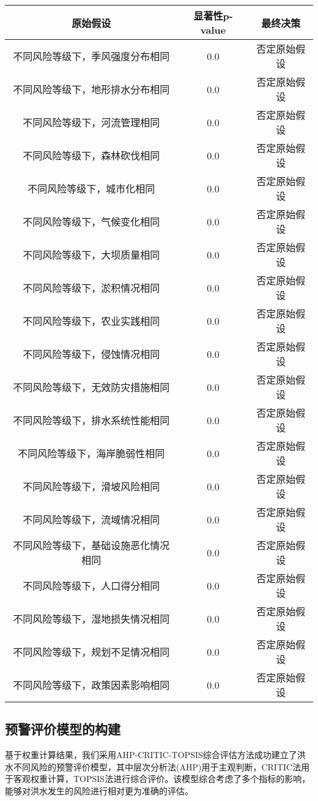 \documentclass[withoutpreface,bwprint]{cumcmthesis} %
\begin{document}
		\begin{longtable}{ccc}
			\toprule
			原始假设 & 显著性p-value & 最终决策 \\
			\midrule
			不同风险等级下，季风强度分布相同 & 0.0 & 否定原始假设 \\
			不同风险等级下，地形排水分布相同 & 0.0 & 否定原始假设 \\
			不同风险等级下，河流管理相同 & 0.0 & 否定原始假设 \\
			不同风险等级下，森林砍伐相同 & 0.0 & 否定原始假设 \\
			不同风险等级下，城市化相同 & 0.0 & 否定原始假设 \\
			不同风险等级下，气候变化相同 & 0.0 & 否定原始假设 \\
			不同风险等级下，大坝质量相同 & 0.0 & 否定原始假设 \\
			不同风险等级下，淤积情况相同 & 0.0 & 否定原始假设 \\
			不同风险等级下，农业实践相同 & 0.0 & 否定原始假设 \\
			不同风险等级下，侵蚀情况相同 & 0.0 & 否定原始假设 \\
			不同风险等级下，无效防灾措施相同 & 0.0 & 否定原始假设 \\
			不同风险等级下，排水系统性能相同 & 0.0 & 否定原始假设 \\
			不同风险等级下，海岸脆弱性相同 & 0.0 & 否定原始假设 \\
			不同风险等级下，滑坡风险相同 & 0.0 & 否定原始假设 \\
			不同风险等级下，流域情况相同 & 0.0 & 否定原始假设 \\
			不同风险等级下，基础设施恶化情况相同 & 0.0 & 否定原始假设 \\
			不同风险等级下，人口得分相同 & 0.0 & 否定原始假设 \\
			不同风险等级下，湿地损失情况相同 & 0.0 & 否定原始假设 \\
			不同风险等级下，规划不足情况相同 & 0.0 & 否定原始假设 \\
			不同风险等级下，政策因素影响相同 & 0.0 & 否定原始假设 \\
			\bottomrule
		\end{longtable}
		


\subsection{预警评价模型的构建}
基于权重计算结果，我们采用AHP-CRITIC-TOPSIS综合评估方法成功建立了洪水不同风险的预警评价模型，其中层次分析法(AHP)用于主观判断，CRITIC法用于客观权重计算，TOPSIS法进行综合评价。该模型综合考虑了多个指标的影响，能够对洪水发生的风险进行相对更为准确的评估。
\end{document}
